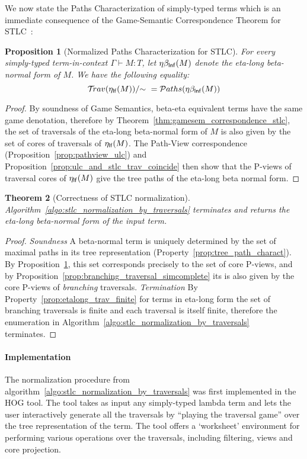 \documentclass{article}
\theoremstyle{plain}
\newtheorem{theorem}{Theorem}[section]
\newtheorem{proposition}[theorem]{Proposition}
\theoremstyle{definition}
\theoremstyle{remark}
\newcommand{\travulc}{\travset}
\newcommand\pathset{{\mathcal{P}aths}} %
\begin{document}
We now state the Paths Characterization of simply-typed terms which is an immediate consequence of the Game-Semantic Correspondence Theorem for STLC~\cite{BlumPhd}:
\begin{proposition}[Normalized Paths Characterization for STLC]
\label{prop:path_charact_stlc}
For every simply-typed term-in-context $\Gamma\vdash M :T$, let $\eta\beta_{\sf lnf}(M)$ denote the eta-long beta-normal form of $M$. We have the following equality:
\begin{equation*}
\travulc(\etalf{M})/{\sim}\ = \pathset(\etabetalnf{M})
\end{equation*}
\end{proposition}
\begin{proof}
 By soundness of Game Semantics, beta-eta equivalent terms have the same game denotation, therefore by Theorem~\ref{thm:gamesem_correspondence_stlc}, the set of traversals of the eta-long beta-normal form of $M$ is also given by the set of cores of traversals of $\eta_{\sf lf}(M)$. The Path-View correspondence (Proposition~\ref{prop:pathview_ulc}) and Proposition~\ref{prop:ulc_and_stlc_trav_coincide} then show that the P-views of traversal cores of $\eta_{\sf lf}(M)$ give the tree paths of the eta-long beta normal form.
\end{proof}



\begin{theorem}[Correctness of STLC normalization]
Algorithm~\ref{algo:stlc_normalization_by_traversals} terminates and returns the eta-long beta-normal form of the input term.
\end{theorem}
\begin{proof}
\emph{Soundness} A beta-normal term is uniquely determined by the set of maximal paths in its tree representation (Property~\ref{prop:tree_path_charact}). By Proposition~\ref{prop:path_charact_stlc}, this set corresponds precisely to the set of core P-views,
and by Proposition~\ref{prop:branching_traversal_simcomplete} its is also given by the core P-views of \emph{branching} traversals.
\emph{Termination} By Property~\ref{prop:etalong_trav_finite} for terms in eta-long form the set of branching traversals is finite and each traversal is itself finite, therefore the enumeration in Algorithm~\ref{algo:stlc_normalization_by_traversals} terminates.
\end{proof}


\paragraph{Implementation} The normalization procedure from algorithm~\ref{algo:stlc_normalization_by_traversals} was first implemented in the HOG tool\cite{BlumGalop2008, BlumPhd}. The tool takes as input any simply-typed lambda term and lets the user interactively generate all the traversals by ``playing the traversal game'' over the tree representation of the term. The tool offers a `worksheet' environment for performing various operations over the traversals, including filtering, views and core projection.
\end{document}
